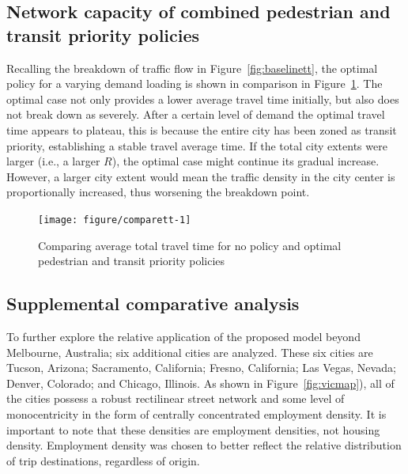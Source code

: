 \documentclass{elsarticle}\usepackage[]{graphicx}\usepackage[]{color}
\newenvironment{knitrout}{}{} %
\begin{document}
\subsection{Network capacity of combined pedestrian and transit priority policies}
Recalling the breakdown of traffic flow in Figure~\ref{fig:baselinett}, the optimal policy for a varying demand loading is shown in comparison in Figure~\ref{fig:comparett}. The optimal case not only provides a lower average travel time initially, but also does not break down as severely. After a certain level of demand the optimal travel time appears to plateau, this is because the entire city has been zoned as transit priority, establishing a stable travel average time. If the total city extents were larger (i.e., a larger $R$), the optimal case might continue its gradual increase. However, a larger city extent would mean the traffic density in the city center is proportionally increased, thus worsening the breakdown point. 

\begin{figure}[H]
    \centering
\begin{knitrout}
\color{fgcolor}
\texttt{[image: figure/comparett-1]} 
\end{knitrout}
    \caption{Comparing average total travel time for no policy and optimal pedestrian and transit priority policies}
    \label{fig:comparett}
\end{figure}


\subsection{Supplemental comparative analysis}
To further explore the relative application of the proposed model beyond Melbourne, Australia; six additional cities are analyzed. These six cities are Tucson, Arizona; Sacramento, California; Fresno, California; Las Vegas, Nevada; Denver, Colorado; and Chicago, Illinois. As shown in Figure~\ref{fig:vicmap}), all of the cities possess a robust rectilinear street network and some level of monocentricity in the form of centrally concentrated employment density. It is important to note that these densities are employment densities, not housing density. Employment density was chosen to better reflect the relative distribution of trip destinations, regardless of origin.
\end{document}
